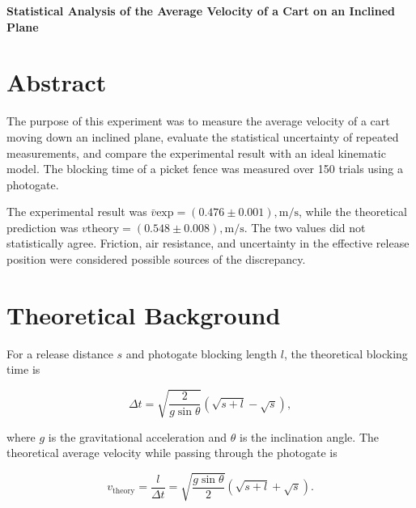 \documentclass[12pt,a4paper]{article}
\begin{document}
\begin{center}
{\Large\bfseries
Statistical Analysis of the Average Velocity of a Cart on an Inclined Plane
}
\end{center}

\section*{Abstract}

The purpose of this experiment was to measure the average velocity of a cart moving down an inclined plane, evaluate the statistical uncertainty of repeated measurements, and compare the experimental result with an ideal kinematic model. The blocking time of a picket fence was measured over 150 trials using a photogate.

The experimental result was $\bar{v}{\mathrm{exp}}=(0.476\pm0.001),\mathrm{m/s}$, while the theoretical prediction was $v{\mathrm{theory}}=(0.548\pm0.008),\mathrm{m/s}$. The two values did not statistically agree. Friction, air resistance, and uncertainty in the effective release position were considered possible sources of the discrepancy.

\section{Theoretical Background}

For a release distance \(s\) and photogate blocking length \(l\), the theoretical blocking time is

\begin{equation}
\Delta t=
\sqrt{\frac{2}{g\sin\theta}}
\left(\sqrt{s+l}-\sqrt{s}\right),
\label{eq:time}
\end{equation}

where \(g\) is the gravitational acceleration and \(\theta\) is the inclination angle. The theoretical average velocity while passing through the photogate is

\begin{equation}
v_{\mathrm{theory}}
=
\frac{l}{\Delta t}
=
\sqrt{\frac{g\sin\theta}{2}}
\left(\sqrt{s+l}+\sqrt{s}\right).
\label{eq:velocity}
\end{equation}
\end{document}

